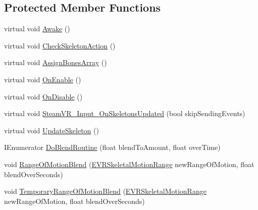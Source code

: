 \subsection*{Protected Member Functions}
\begin{DoxyCompactItemize}
\item 
virtual void \mbox{\hyperlink{class_valve_1_1_v_r_1_1_steam_v_r___behaviour___skeleton_a9c5e89540853309a1fa6bc4bca0e33b7}{Awake}} ()
\item 
virtual void \mbox{\hyperlink{class_valve_1_1_v_r_1_1_steam_v_r___behaviour___skeleton_a7a2e6a9ca4acbc2c592a9afe754b3c64}{Check\+Skeleton\+Action}} ()
\item 
virtual void \mbox{\hyperlink{class_valve_1_1_v_r_1_1_steam_v_r___behaviour___skeleton_a1d94d724c0240744213baf0b550af9c0}{Assign\+Bones\+Array}} ()
\item 
virtual void \mbox{\hyperlink{class_valve_1_1_v_r_1_1_steam_v_r___behaviour___skeleton_a011176dfa08282467c3bd685ffe86b4f}{On\+Enable}} ()
\item 
virtual void \mbox{\hyperlink{class_valve_1_1_v_r_1_1_steam_v_r___behaviour___skeleton_ade41bbdc6afa466a65b9776953563494}{On\+Disable}} ()
\item 
virtual void \mbox{\hyperlink{class_valve_1_1_v_r_1_1_steam_v_r___behaviour___skeleton_aed98f569c32bea5ec03f97364d7374ee}{Steam\+V\+R\+\_\+\+Input\+\_\+\+On\+Skeletons\+Updated}} (bool skip\+Sending\+Events)
\item 
virtual void \mbox{\hyperlink{class_valve_1_1_v_r_1_1_steam_v_r___behaviour___skeleton_a6b70411995e7cf4952af437767df1d77}{Update\+Skeleton}} ()
\item 
I\+Enumerator \mbox{\hyperlink{class_valve_1_1_v_r_1_1_steam_v_r___behaviour___skeleton_a9c87664a5fcf9306f84858ce43624734}{Do\+Blend\+Routine}} (float blend\+To\+Amount, float over\+Time)
\item 
void \mbox{\hyperlink{class_valve_1_1_v_r_1_1_steam_v_r___behaviour___skeleton_a3614456d384667803ed33e22d9006ef3}{Range\+Of\+Motion\+Blend}} (\mbox{\hyperlink{namespace_valve_1_1_v_r_affc8d18345f8f5d36f1ae7b4ce534500}{E\+V\+R\+Skeletal\+Motion\+Range}} new\+Range\+Of\+Motion, float blend\+Over\+Seconds)
\item 
void \mbox{\hyperlink{class_valve_1_1_v_r_1_1_steam_v_r___behaviour___skeleton_a7c0e4152b182bad3055bf31434f4cb0d}{Temporary\+Range\+Of\+Motion\+Blend}} (\mbox{\hyperlink{namespace_valve_1_1_v_r_affc8d18345f8f5d36f1ae7b4ce534500}{E\+V\+R\+Skeletal\+Motion\+Range}} new\+Range\+Of\+Motion, float blend\+Over\+Seconds)

\end{DoxyCompactItemize}
